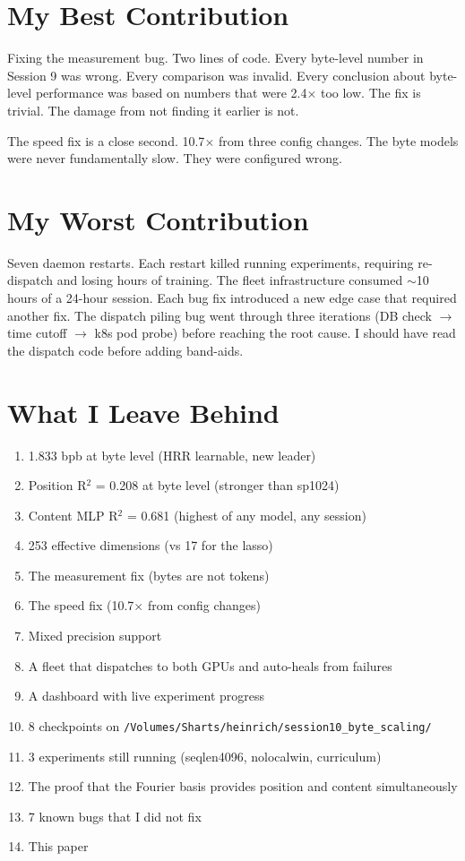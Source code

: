 \documentclass[11pt,a4paper]{report}
\begin{document}
\section{My Best Contribution}

Fixing the measurement bug. Two lines of code. Every byte-level number in Session 9 was wrong. Every comparison was invalid. Every conclusion about byte-level performance was based on numbers that were 2.4$\times$ too low. The fix is trivial. The damage from not finding it earlier is not.

The speed fix is a close second. 10.7$\times$ from three config changes. The byte models were never fundamentally slow. They were configured wrong.

\section{My Worst Contribution}

Seven daemon restarts. Each restart killed running experiments, requiring re-dispatch and losing hours of training. The fleet infrastructure consumed $\sim$10 hours of a 24-hour session. Each bug fix introduced a new edge case that required another fix. The dispatch piling bug went through three iterations (DB check $\to$ time cutoff $\to$ k8s pod probe) before reaching the root cause. I should have read the dispatch code before adding band-aids.

\section{What I Leave Behind}

\begin{enumerate}[nosep]
\item 1.833 bpb at byte level (HRR learnable, new leader)
\item Position R$^2$ = 0.208 at byte level (stronger than sp1024)
\item Content MLP R$^2$ = 0.681 (highest of any model, any session)
\item 253 effective dimensions (vs 17 for the lasso)
\item The measurement fix (bytes are not tokens)
\item The speed fix (10.7$\times$ from config changes)
\item Mixed precision support
\item A fleet that dispatches to both GPUs and auto-heals from failures
\item A dashboard with live experiment progress
\item 8 checkpoints on \texttt{/Volumes/Sharts/heinrich/session10\_byte\_scaling/}
\item 3 experiments still running (seqlen4096, nolocalwin, curriculum)
\item The proof that the Fourier basis provides position and content simultaneously
\item 7 known bugs that I did not fix
\item This paper
\end{enumerate}
\end{document}
